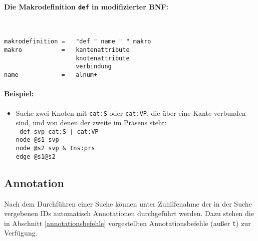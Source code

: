 \documentclass[12pt]{scrartcl}
\begin{document}
\paragraph*{Die Makrodefinition \texttt{def} in modifizierter BNF:}
~
\begin{framed}
\begin{lstlisting}
makrodefinition =   "def " name " " makro
makro           =   kantenattribute
                    knotenattribute
                    verbindung
name            =   alnum+
\end{lstlisting}
\end{framed}


\paragraph*{Beispiel:}
\begin{itemize}
	\item Suche zwei Knoten mit \texttt{cat:S} oder \texttt{cat:VP}, die über eine Kante verbunden sind, und von denen der zweite im Präsens steht:\\
	{\tt
	def svp cat:S | cat:VP\\[-.4ex]
	node @s1 svp\\[-.4ex]
	node @s2 svp \& tns:prs\\[-.4ex]
	edge @s1@s2\\[-.4ex]
	}
\end{itemize}



\subsection{Annotation}

Nach dem Durchführen einer Suche können unter Zuhilfenahme der in der Suche vergebenen IDs automatisch Annotationen durchgeführt werden. Dazu stehen die in Abschnitt \ref{annotationsbefehle} vorgestellten Annotationsbefehle (außer \texttt{t}) zur Verfügung.
\end{document}
